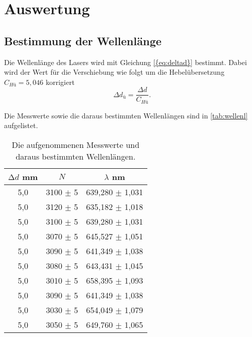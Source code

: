 \section{Auswertung}
\label{sec:Auswertung}

\subsection{Bestimmung der Wellenlänge}

Die Wellenlänge des Lasers wird mit Gleichung \autoref{{eq:deltad}} bestimmt. 
Dabei wird der Wert für die Verschiebung wie folgt um die Hebelübersetzung $C_{Hü} = 5,046$ korrigiert 
\begin{equation*}
  \Delta d_ü = \frac{\Delta d}{C_{Hü}} .
\end{equation*}

Die Messwerte sowie die daraus bestimmten Wellenlängen sind in \autoref{tab:wellenl} aufgelistet.\\

\begin{table}
    \centering
    \caption{Die aufgenommenen Messwerte und daraus bestimmten Wellenlängen.}
    \label{tab:wellenl}
    \begin{tabular}{c c c}
      \toprule
      {$\increment d$ mm} & {$N$} & {$\lambda$ nm} \\
      \midrule
      5,0     &       3100 $\pm$ 5    &   639,280 $\pm$ 1,031\\
      5,0     &       3120 $\pm$ 5    &   635,182 $\pm$ 1,018\\
      5,0     &       3100 $\pm$ 5    &   639,280 $\pm$ 1,031\\
      5,0     &       3070 $\pm$ 5    &   645,527 $\pm$ 1,051\\
      5,0     &       3090 $\pm$ 5    &   641,349 $\pm$ 1,038\\
      5,0     &       3080 $\pm$ 5    &   643,431 $\pm$ 1,045\\
      5,0     &       3010 $\pm$ 5    &   658,395 $\pm$ 1,093\\
      5,0     &       3090 $\pm$ 5    &   641,349 $\pm$ 1,038\\
      5,0     &       3030 $\pm$ 5    &   654,049 $\pm$ 1,079\\
      5,0     &       3050 $\pm$ 5    &   649,760 $\pm$ 1,065\\
      \bottomrule
    \end{tabular}
  \end{table}
  \noindent

